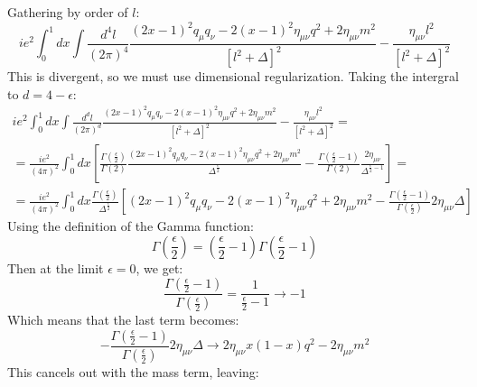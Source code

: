 \documentclass{article}
\begin{document}
Gathering by order of $l$:
\begin{equation}
    i e^2 \int_0^1 dx \int \frac{d^4 l}{(2\pi)^4}
    \frac{(2x - 1)^2q_\mu q_\nu - 2(x - 1)^2 \eta_{\mu\nu} q^2 + 2\eta_{\mu\nu} m^2}{\left[l^2 + \Delta\right]^2} - \frac{\eta_{\mu\nu} l^2}{\left[l^2 + \Delta\right]^2}
\end{equation}
This is divergent, so we must use dimensional regularization. Taking the intergral to $d = 4 - \epsilon$:
\begin{equation}
\begin{gathered}
    i e^2 \int_0^1 dx \int \frac{d^d l}{(2\pi)^d}
    \frac{(2x - 1)^2q_\mu q_\nu - 2(x - 1)^2 \eta_{\mu\nu} q^2 + 2\eta_{\mu\nu} m^2}{\left[l^2 + \Delta\right]^2} - \frac{\eta_{\mu\nu} l^2}{\left[l^2 + \Delta\right]^2} = \\ =
    \frac{i e^2}{(4\pi)^2} \int_0^1 dx \left[
        \frac{\Gamma\left(\frac{\epsilon}{2}\right)}{\Gamma(2)}\frac{(2x - 1)^2q_\mu q_\nu - 2(x - 1)^2 \eta_{\mu\nu} q^2 + 2\eta_{\mu\nu} m^2}{\Delta^{\frac{\epsilon}{2}}} - \frac{\Gamma(\frac{\epsilon}{2} - 1)}{\Gamma(2)}\frac{2\eta_{\mu\nu}}{\Delta^{\frac{\epsilon}{2}-1}}
    \right] = \\ =
    \frac{i e^2}{(4\pi)^2} \int_0^1 dx \frac{\Gamma\left(\frac{\epsilon}{2}\right)}{\Delta^{\frac{\epsilon}{2}}} \left[
        (2x - 1)^2q_\mu q_\nu - 2(x - 1)^2 \eta_{\mu\nu} q^2 + 2\eta_{\mu\nu} m^2 - \frac{\Gamma(\frac{\epsilon}{2} - 1)}{\Gamma\left(\frac{\epsilon}{2}\right)}2\eta_{\mu\nu} \Delta
    \right]
\end{gathered}
\end{equation}
Using the definition of the Gamma function:
\begin{equation}
    \Gamma\left(\frac{\epsilon}{2}\right) = \left(\frac{\epsilon}{2} - 1\right)\Gamma\left(\frac{\epsilon}{2} - 1\right)
\end{equation}
Then at the limit $\epsilon = 0$, we get:
\begin{equation}
    \frac{\Gamma(\frac{\epsilon}{2} - 1)}{\Gamma\left(\frac{\epsilon}{2}\right)} = \frac{1}{\frac{\epsilon}{2} - 1} \rightarrow -1
\end{equation}
Which means that the last term becomes:
\begin{equation}
     - \frac{\Gamma(\frac{\epsilon}{2} - 1)}{\Gamma\left(\frac{\epsilon}{2}\right)}2\eta_{\mu\nu} \Delta \rightarrow 2\eta_{\mu\nu}x(1 - x)q^2 - 2\eta_{\mu\nu}m^2
\end{equation}
This cancels out with the mass term, leaving:
\end{document}
